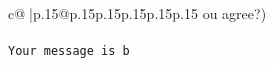 \documentclass{article}
\begin{document}
{\begin{supertabular}{c@{$\;$}|p{.15\linewidth}@{}p{.15\linewidth}p{.15\linewidth}p{.15\linewidth}p{.15\linewidth}p{.15\linewidth}}
{{{ou agree?)\\ \tt \\ \tt Your message is b}}}
\end{supertabular}}
\end{document}
